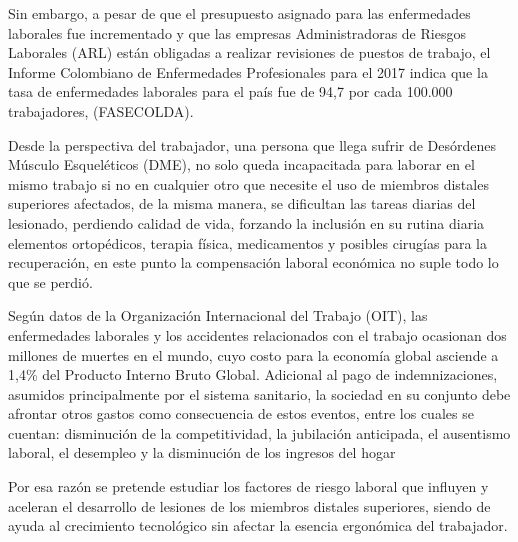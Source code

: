 Sin embargo, a pesar de que el presupuesto asignado para las enfermedades laborales fue incrementado y que las empresas Administradoras de Riesgos Laborales (ARL) están obligadas a realizar revisiones de puestos de trabajo, el Informe Colombiano de Enfermedades Profesionales para el 2017 indica que la tasa de enfermedades laborales para el país fue de 94,7 por cada 100.000 trabajadores, (FASECOLDA). 

Desde la perspectiva del trabajador, una persona que llega sufrir de Desórdenes Músculo Esqueléticos (DME), no solo queda incapacitada para laborar en el mismo trabajo si no en cualquier otro que necesite el uso de miembros distales superiores afectados, de la misma manera, se dificultan las tareas diarias del lesionado, perdiendo calidad de vida, forzando la inclusión en su rutina diaria elementos ortopédicos, terapia física, medicamentos y posibles cirugías para la recuperación, en este punto la compensación laboral económica no suple todo lo que se perdió. 

Según datos de la Organización Internacional del
Trabajo (OIT), las enfermedades laborales y los accidentes
relacionados con el trabajo ocasionan dos millones de
muertes en el mundo, cuyo costo para la economía global asciende
a 1,4\% del Producto Interno Bruto Global. Adicional al
pago de indemnizaciones, asumidos principalmente por el
sistema sanitario, la sociedad en su conjunto debe afrontar
otros gastos como consecuencia de estos eventos, entre
los cuales se cuentan: disminución de la competitividad, la
jubilación anticipada, el ausentismo laboral, el desempleo
y la disminución de los ingresos del hogar \parencite{OrganizacionInternacionaldelTrabajo2003OIT:Billones}


Por esa razón se pretende estudiar los factores de riesgo laboral que influyen y aceleran el desarrollo de lesiones de los miembros distales superiores, siendo de ayuda al crecimiento tecnológico sin afectar la esencia ergonómica del trabajador.



